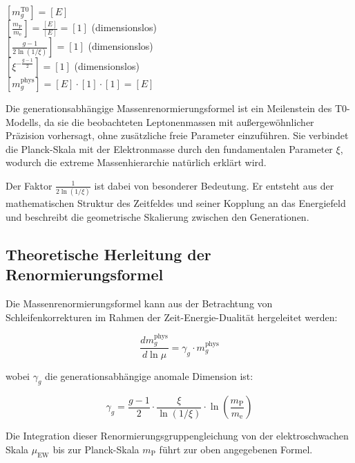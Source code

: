 \documentclass[12pt,a4paper]{article}
\theoremstyle{definition}
\begin{document}
\begin{einheitencheck}
	$[m_g^{\text{T0}}] = [E]$\\
	$[\frac{m_{\text{P}}}{m_{\text{e}}}] = \frac{[E]}{[E]} = [1]$ (dimensionslos)\\
	$[\frac{g-1}{2\ln(1/\xi)}] = [1]$ (dimensionslos)\\
	$[\xi^{-\frac{g-1}{2}}] = [1]$ (dimensionslos)\\
	$[m_g^{\text{phys}}] = [E] \cdot [1] \cdot [1] = [E]$ \checkmark
\end{einheitencheck}

\begin{wichtig}
	Die generationsabhängige Massenrenormierungsformel ist ein Meilenstein des T0-Modells, da sie die beobachteten Leptonenmassen mit außergewöhnlicher Präzision vorhersagt, ohne zusätzliche freie Parameter einzuführen. Sie verbindet die Planck-Skala mit der Elektronmasse durch den fundamentalen Parameter $\xi$, wodurch die extreme Massenhierarchie natürlich erklärt wird.
	
	Der Faktor $\frac{1}{2\ln(1/\xi)}$ ist dabei von besonderer Bedeutung. Er entsteht aus der mathematischen Struktur des Zeitfeldes und seiner Kopplung an das Energiefeld und beschreibt die geometrische Skalierung zwischen den Generationen.
\end{wichtig}

\subsection{Theoretische Herleitung der Renormierungsformel}

Die Massenrenormierungsformel kann aus der Betrachtung von Schleifenkorrekturen im Rahmen der Zeit-Energie-Dualität hergeleitet werden:

\begin{equation}
	\frac{dm_g^{\text{phys}}}{d\ln \mu} = \gamma_g \cdot m_g^{\text{phys}}
\end{equation}

wobei $\gamma_g$ die generationsabhängige anomale Dimension ist:

\begin{equation}
	\gamma_g = \frac{g-1}{2} \cdot \frac{\xi}{\ln(1/\xi)} \cdot \ln\left(\frac{m_{\text{P}}}{m_{\text{e}}}\right)
\end{equation}

Die Integration dieser Renormierungsgruppengleichung von der elektroschwachen Skala $\mu_{\text{EW}}$ bis zur Planck-Skala $m_{\text{P}}$ führt zur oben angegebenen Formel.
\end{document}
